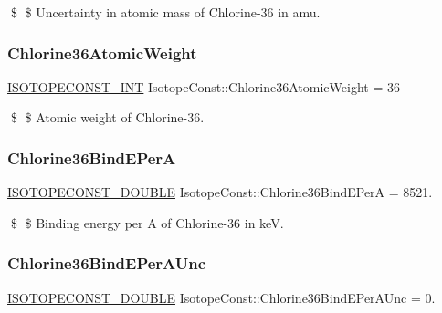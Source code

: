 \$ \$ Uncertainty in atomic mass of Chlorine-\/36 in amu. \mbox{\label{group___isotope_const-_chlorine-_cl36_gac8b704cea72e7d9b8537ae8b1b2752ce}} 
\subsubsection{\texorpdfstring{Chlorine36\+Atomic\+Weight}{Chlorine36AtomicWeight}}
{\footnotesize\ttfamily \mbox{\hyperlink{group___isotope_const-_macros_ga5f18360b3e99483a35c32d789e62621c}{I\+S\+O\+T\+O\+P\+E\+C\+O\+N\+S\+T\+\_\+\+I\+NT}} Isotope\+Const\+::\+Chlorine36\+Atomic\+Weight = 36}

\$ \$ Atomic weight of Chlorine-\/36. \mbox{\label{group___isotope_const-_chlorine-_cl36_gab72eee739831499644ef8708d6d8a697}} 
\subsubsection{\texorpdfstring{Chlorine36\+Bind\+E\+PerA}{Chlorine36BindEPerA}}
{\footnotesize\ttfamily \mbox{\hyperlink{group___isotope_const-_macros_ga8f45a7272ce02c0b4c65c44636ed719a}{I\+S\+O\+T\+O\+P\+E\+C\+O\+N\+S\+T\+\_\+\+D\+O\+U\+B\+LE}} Isotope\+Const\+::\+Chlorine36\+Bind\+E\+PerA = 8521.}

\$ \$ Binding energy per A of Chlorine-\/36 in keV. \mbox{\label{group___isotope_const-_chlorine-_cl36_ga7baa8b52e71e9646d175b3866f6c09cb}} 
\subsubsection{\texorpdfstring{Chlorine36\+Bind\+E\+Per\+A\+Unc}{Chlorine36BindEPerAUnc}}
{\footnotesize\ttfamily \mbox{\hyperlink{group___isotope_const-_macros_ga8f45a7272ce02c0b4c65c44636ed719a}{I\+S\+O\+T\+O\+P\+E\+C\+O\+N\+S\+T\+\_\+\+D\+O\+U\+B\+LE}} Isotope\+Const\+::\+Chlorine36\+Bind\+E\+Per\+A\+Unc = 0.}

